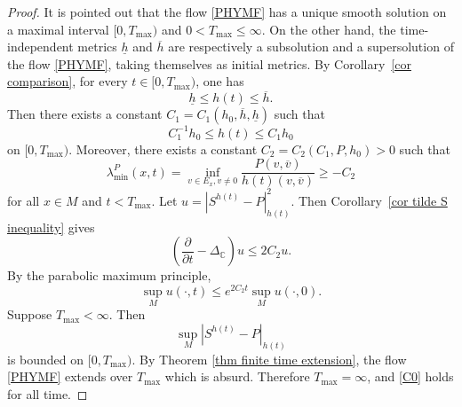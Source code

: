 \documentclass[12pt, reqno]{amsart}
\theoremstyle{plain}
\theoremstyle{definition}
\newcommand{\bproof}{\begin{proof}}
\newcommand{\eproof}{\end{proof}}
\newcommand{\p}{\partial}
\renewcommand{\bar}{\overline}
\newcommand{\beq}{\begin{equation}}
\newcommand{\eeq}{\end{equation}}
\renewcommand{\>}{\rightarrow}
\newcommand{\C}{{\mathbb C}}
\renewcommand{\>}{\rightarrow}
\renewcommand{\p}{{\partial}}
\renewcommand{\bar}{\overline}
\numberwithin{equation}{section} %
\begin{document}
\bproof
It is pointed out that the flow \eqref{PHYMF} has a unique smooth solution on a maximal interval $[0,T_{\max})$ and $0<T_{\max}\leq \infty$. On the other hand,  the time-independent metrics $\underline h$ and $\overline h$ are respectively a subsolution and a supersolution of the flow \eqref{PHYMF}, taking themselves as initial metrics.
By Corollary~\ref{cor comparison}, for every $t\in[0,T_{\max})$, one has
\beq
\underline h\leq h(t)\leq \overline h.
\label{global order bound from barriers}
\eeq
 Then there exists a constant $C_1=C_1(h_0,\overline h, \underline h)$ such that $$C_1^{-1}h_0\leq h(t)\leq C_1h_0$$ on $[0,T_{\max})$.  Moreover, there exists a constant $C_2=C_2(C_1, P, h_0)>0$ such that
\beq
\lambda^P_{\min}(x,t)=\inf_{v \in E_x, v\neq 0}  \frac{ P(v, \bar v) }{h(t)(v,\bar v)}\geq -C_2
\label{lambda lower on finite interval}
\eeq
for all $x\in M$ and $t<T_{\max}$. Let $u=|S^{h(t)}-P|_{h(t)}^2$. Then Corollary~\ref{cor tilde S inequality} gives
\beq
\left(\frac{\p}{\p t}-\Delta_\C\right)u\leq 2C_2u.
\label{finite interval tilde S max inequality}
\eeq
 By the parabolic maximum principle, \beq \sup_M u(\cdot,t)\leq e^{2C_2t}\sup_M u(\cdot,0).\eeq   Suppose $T_{\max}<\infty$. Then \beq \sup_M|S^{h(t)}-P|_{h(t)}\eeq  is bounded on $[0,T_{\max})$.  By Theorem \ref{thm finite time extension}, the flow \eqref{PHYMF} extends  over $T_{\max}$ which is absurd. Therefore $T_{\max}=\infty$, and \eqref{C0} holds for all time.   \eproof



\baselineskip
\end{document}
